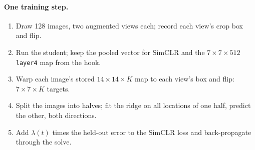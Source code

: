 \documentclass[11pt]{article}
\begin{document}
\paragraph{One training step.}
\begin{enumerate}[leftmargin=*]
\item Draw 128 images, two augmented views each; record each view's crop box and flip.
\item Run the student; keep the pooled vector for SimCLR and the $7\times7\times512$ \texttt{layer4} map from the hook.
\item Warp each image's stored $14\times14\times K$ map to each view's box and flip: $7\times7\times K$ targets.
\item Split the images into halves; fit the ridge on all locations of one half, predict the other, both directions.
\item Add $\lambda(t)$ times the held-out error to the SimCLR loss and back-propagate through the solve.
\end{enumerate}
\end{document}
